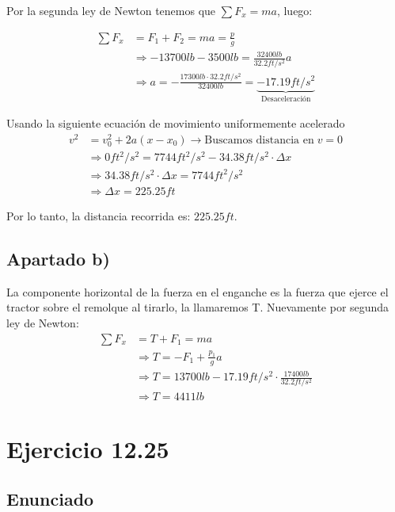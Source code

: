 \documentclass[11pt]{article}
\begin{document}
Por la segunda ley de Newton tenemos que $\sum F_x = ma$, luego:

\begin{align*}
  \sum F_x &= F_1 + F_2 = ma = \frac{p}{g} \\
           &\Rightarrow -13700lb - 3500lb = \frac{32400lb}{32.2 ft/s^2}a \\
           &\Rightarrow a = - \frac{17300lb \cdot 32.2ft/s^2}{32400lb} 
           = \underbrace{-17.19ft/s^2}_{\text{Desaceleración}}
\end{align*}

Usando la siguiente ecuación de movimiento uniformemente acelerado
\begin{align*}
  v^2 &= v^2_0 +2a(x-x_0) \rightarrow \text{Buscamos distancia en} \; v = 0 \\
      &\Rightarrow 0ft^2/s^2 = 7744ft^2/s^2 - 34.38ft/s^2 \cdot \Delta x \\
      &\Rightarrow 34.38ft/s^2 \cdot \Delta x = 7744ft^2/s^2 \\
      &\Rightarrow \Delta x = 225.25ft
\end{align*}

Por lo tanto, la distancia recorrida es: $225.25ft$. 

\subsection*{Apartado b)}

La componente horizontal de la fuerza en el enganche es la fuerza que ejerce
el tractor sobre el remolque al tirarlo, la llamaremos T.
Nuevamente por segunda ley de Newton:
\begin{align*}
  \sum F_x &= T + F_1 = ma \\
           &\Rightarrow T = -F_1 + \frac{p_1}{g}a \\
           &\Rightarrow T = 13700lb - 17.19ft/s^2 \cdot \frac{17400lb}{32.2ft/s^2} \\
           &\Rightarrow T = 4411lb
\end{align*}


\section*{Ejercicio 12.25}

\subsection*{Enunciado}
\end{document}

